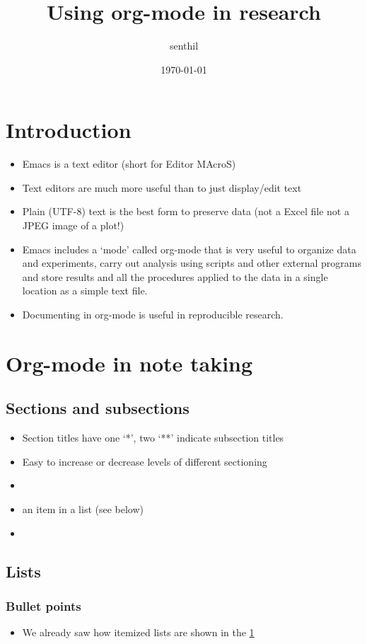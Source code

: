 \documentclass[a4paper, twoside]{article}
\author{senthil}
\date{\today}
\title{Using org-mode in research}
\begin{document}
\maketitle

\section{Introduction}
\label{sec:org5a75567}
\begin{itemize}
\item Emacs is a text editor (short for Editor MAcroS)
\item Text editors are much more useful than to just display/edit text
\item Plain (UTF-8) text is the best form to preserve data (not a Excel
file not a JPEG image of a plot!)
\item Emacs includes a `mode' called org-mode that is very useful to
organize data and experiments, carry out analysis using scripts
and other external programs and store results and all the
procedures applied to the data in a single location as a simple
text file.
\item Documenting in org-mode is useful in reproducible research.
\end{itemize}
\section{Org-mode in note taking}
\label{sec:org8d57b61}
\subsection{Sections and subsections}
\label{sec:org359347d}
\begin{itemize}
\item Section titles have one `*', two `**' indicate subsection titles
\item Easy to increase or decrease levels of different sectioning
\item 

\item an item in a list (see below)
\item 
\end{itemize}
\subsection{Lists}
\label{sec:org339f4ca}
\subsubsection{Bullet points}
\label{sec:orgd75efda}
\begin{itemize}
\item We already saw how itemized lists are shown in the \ref{sec:org5a75567}
\end{itemize}
\end{document}
